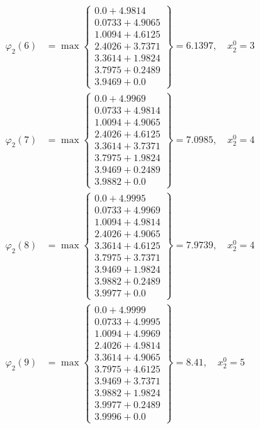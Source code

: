 \documentclass{article}
\begin{document}
\begin{align*}
  
  
  
\varphi_{2}(6) &= \max \left\{ \begin{array}{c}
0.0 + 4.9814 \\
 0.0733 + 4.9065 \\
 1.0094 + 4.6125 \\
 2.4026 + 3.7371 \\
 3.3614 + 1.9824 \\
 3.7975 + 0.2489 \\
 3.9469 + 0.0
\end{array} \right\}=6.1397,\quad x_{2}^0=3\\
  
  
  
  
\varphi_{2}(7) &= \max \left\{ \begin{array}{c}
0.0 + 4.9969 \\
 0.0733 + 4.9814 \\
 1.0094 + 4.9065 \\
 2.4026 + 4.6125 \\
 3.3614 + 3.7371 \\
 3.7975 + 1.9824 \\
 3.9469 + 0.2489 \\
 3.9882 + 0.0
\end{array} \right\}=7.0985,\quad x_{2}^0=4\\
  
  
  
  
\varphi_{2}(8) &= \max \left\{ \begin{array}{c}
0.0 + 4.9995 \\
 0.0733 + 4.9969 \\
 1.0094 + 4.9814 \\
 2.4026 + 4.9065 \\
 3.3614 + 4.6125 \\
 3.7975 + 3.7371 \\
 3.9469 + 1.9824 \\
 3.9882 + 0.2489 \\
 3.9977 + 0.0
\end{array} \right\}=7.9739,\quad x_{2}^0=4\\
  
  
  
  
\varphi_{2}(9) &= \max \left\{ \begin{array}{c}
0.0 + 4.9999 \\
 0.0733 + 4.9995 \\
 1.0094 + 4.9969 \\
 2.4026 + 4.9814 \\
 3.3614 + 4.9065 \\
 3.7975 + 4.6125 \\
 3.9469 + 3.7371 \\
 3.9882 + 1.9824 \\
 3.9977 + 0.2489 \\
 3.9996 + 0.0
\end{array} \right\}=8.41,\quad x_{2}^0=5\\
  

\end{align*}
\end{document}
